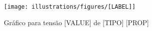 \begin{figure}[H]
	\centering
	\caption{Gráfico para tensão [VALUE] de [TIPO] [PROP]}
    \texttt{[image: illustrations/figures/[LABEL]]}
\end{figure}
